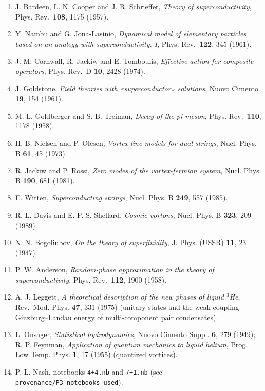 \documentclass[
  10pt,
]{article}
\providecommand{\tightlist}{%
  \setlength{\itemsep}{0pt}\setlength{\parskip}{0pt}}
\begin{document}
\begin{enumerate}
\def\labelenumi{\arabic{enumi}.}
\tightlist
\item
  J. Bardeen, L. N. Cooper and J. R. Schrieffer, \emph{Theory of
  superconductivity}, Phys. Rev.~\textbf{108}, 1175 (1957).
\item
  Y. Nambu and G. Jona-Lasinio, \emph{Dynamical model of elementary
  particles based on an analogy with superconductivity. I}, Phys.
  Rev.~\textbf{122}, 345 (1961).
\item
  J. M. Cornwall, R. Jackiw and E. Tomboulis, \emph{Effective action for
  composite operators}, Phys. Rev.~D \textbf{10}, 2428 (1974).
\item
  J. Goldstone, \emph{Field theories with «superconductor» solutions},
  Nuovo Cimento \textbf{19}, 154 (1961).
\item
  M. L. Goldberger and S. B. Treiman, \emph{Decay of the pi meson},
  Phys. Rev.~\textbf{110}, 1178 (1958).
\item
  H. B. Nielsen and P. Olesen, \emph{Vortex-line models for dual
  strings}, Nucl. Phys. B \textbf{61}, 45 (1973).
\item
  R. Jackiw and P. Rossi, \emph{Zero modes of the vortex-fermion
  system}, Nucl. Phys. B \textbf{190}, 681 (1981).
\item
  E. Witten, \emph{Superconducting strings}, Nucl. Phys. B \textbf{249},
  557 (1985).
\item
  R. L. Davis and E. P. S. Shellard, \emph{Cosmic vortons}, Nucl. Phys.
  B \textbf{323}, 209 (1989).
\item
  N. N. Bogoliubov, \emph{On the theory of superfluidity}, J. Phys.
  (USSR) \textbf{11}, 23 (1947).
\item
  P. W. Anderson, \emph{Random-phase approximation in the theory of
  superconductivity}, Phys. Rev.~\textbf{112}, 1900 (1958).
\item
  A. J. Leggett, \emph{A theoretical description of the new phases of
  liquid \(^3\)He}, Rev.~Mod. Phys. \textbf{47}, 331 (1975) (unitary
  states and the weak-coupling Ginzburg--Landau energy of
  multi-component pair condensates).
\item
  L. Onsager, \emph{Statistical hydrodynamics}, Nuovo Cimento Suppl.
  \textbf{6}, 279 (1949); R. P. Feynman, \emph{Application of quantum
  mechanics to liquid helium}, Prog. Low Temp. Phys. \textbf{1}, 17
  (1955) (quantized vortices).
\item
  P. L. Nash, notebooks \texttt{4+4.nb} and \texttt{7+1.nb} (see
  \texttt{provenance/P3\_notebooks\_used}).
\end{enumerate}
\end{document}
